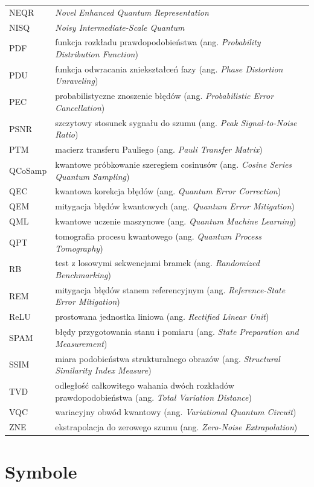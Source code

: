 \begin{longtable}{@{}p{}p{}@{}}
NEQR & \emph{Novel Enhanced Quantum Representation} \\
NISQ & \emph{Noisy Intermediate-Scale Quantum} \\
PDF & funkcja rozkładu prawdopodobieństwa (ang. \emph{Probability Distribution Function}) \\
PDU & funkcja odwracania zniekształceń fazy (ang. \emph{Phase Distortion Unraveling}) \\
PEC & probabilistyczne znoszenie błędów (ang. \emph{Probabilistic Error Cancellation}) \\
PSNR & szczytowy stosunek sygnału do szumu (ang. \emph{Peak Signal-to-Noise Ratio}) \\
PTM & macierz transferu Pauliego (ang. \emph{Pauli Transfer Matrix}) \\
QCoSamp & kwantowe próbkowanie szeregiem cosinusów (ang. \emph{Cosine Series Quantum Sampling}) \\
QEC & kwantowa korekcja błędów (ang. \emph{Quantum Error Correction}) \\
QEM & mitygacja błędów kwantowych (ang. \emph{Quantum Error Mitigation}) \\
QML & kwantowe uczenie maszynowe (ang. \emph{Quantum Machine Learning}) \\
QPT & tomografia procesu kwantowego (ang. \emph{Quantum Process Tomography}) \\
RB & test z losowymi sekwencjami bramek (ang. \emph{Randomized Benchmarking}) \\
REM & mitygacja błędów stanem referencyjnym (ang. \emph{Reference-State Error Mitigation}) \\
ReLU & prostowana jednostka liniowa (ang. \emph{Rectified Linear Unit}) \\
SPAM & błędy przygotowania stanu i pomiaru (ang. \emph{State Preparation and Measurement}) \\
SSIM & miara podobieństwa strukturalnego obrazów (ang. \emph{Structural Similarity Index Measure}) \\
TVD & odległość całkowitego wahania dwóch rozkładów prawdopodobieństwa (ang. \emph{Total Variation Distance}) \\
VQC & wariacyjny obwód kwantowy (ang. \emph{Variational Quantum Circuit}) \\
ZNE & ekstrapolacja do zerowego szumu (ang. \emph{Zero-Noise Extrapolation}) \\
\bottomrule
\end{longtable}

\section*{Symbole}

